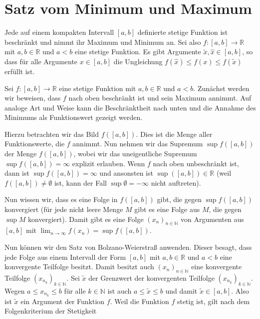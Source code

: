 \documentclass[fontsize=9pt,
               parskip=half-,
               DIV=14,
               listof=chapterentry,
               tocflat]{scrbook}
\begin{document}
\section{Satz vom Minimum und Maximum}

\begin{theorem*}
Jede auf einem kompakten Intervall $[a,b]$ definierte stetige Funktion ist beschränkt und nimmt ihr Maximum und Minimum an. Sei also $f:[a,b]\to \mathbb {R} $ mit $a,b\in \mathbb {R} $ und $a<b$ eine stetige Funktion. Es gibt Argumente ${\tilde {x}},{\hat {x}}\in [a,b]$, so dass für alle Argumente $x\in [a,b]$ die Ungleichung $f({\hat {x}})\leq f(x)\leq f({\tilde {x}})$ erfüllt ist.

\end{theorem*}

\begin{proof*}
Sei $f:[a,b]\to \mathbb {R} $ eine stetige Funktion mit $a,b\in \mathbb {R} $ und $a<b$. Zunächst werden wir beweisen, dass $f$ nach oben beschränkt ist und sein Maximum annimmt. Auf analoge Art und Weise kann die Beschränktheit nach unten und die Annahme des Minimums als Funktionswert gezeigt werden.

Hierzu betrachten wir das Bild $f([a,b])$. Dies ist die Menge aller Funktionswerte, die $f$ annimmt. Nun nehmen wir das Supremum $\sup f([a,b])$ der Menge $f([a,b])$, wobei wir das uneigentliche Supremum $\sup f([a,b])=\infty $ explizit erlauben. Wenn $f$ nach oben unbeschränkt ist, dann ist $\sup f([a,b])=\infty $ und ansonsten ist $\sup([a,b])\in \mathbb {R} $ (weil $f([a,b])\neq \emptyset $ ist, kann der Fall $\sup \emptyset =-\infty $ nicht auftreten).

Nun wissen wir, dass es eine Folge in $f([a,b])$ gibt, die gegen $\sup f([a,b])$ konvergiert (für jede nicht leere Menge $M$ gibt es eine Folge aus $M$, die gegen $\sup M$ konvergiert). Damit gibt es eine Folge $(x_{n})_{n\in \mathbb {N} }$ von Argumenten aus $[a,b]$ mit $\lim _{n\to \infty }f(x_{n})=\sup f([a,b])$.

Nun können wir den Satz von Bolzano-Weierstraß anwenden. Dieser besagt, dass jede Folge aus einem Intervall der Form $[a,b]$ mit $a,b\in \mathbb {R} $ und $a<b$ eine konvergente Teilfolge besitzt. Damit besitzt auch $(x_{n})_{n\in \mathbb {N} }$ eine konvergente Teilfolge $\left(x_{n_{k}}\right)_{k\in \mathbb {N} }$. Sei ${\tilde {x}}$ der Grenzwert der konvergenten Teilfolge $\left(x_{n_{k}}\right)_{k\in \mathbb {N} }$. Wegen $a\leq x_{n_{k}}\leq b$ für alle $k\in \mathbb {N} $ ist auch $a\leq {\tilde {x}}\leq b$ und damit ${\tilde {x}}\in [a,b]$. Also ist ${\tilde {x}}$ ein Argument der Funktion $f$. Weil die Funktion $f$ stetig ist, gilt nach dem Folgenkriterium der Stetigkeit


\end{proof*}
\end{document}
